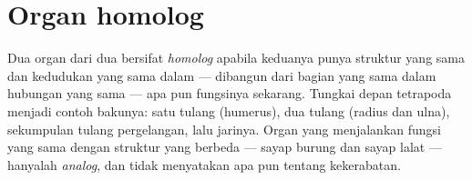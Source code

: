 \section{Organ homolog}

\begin{definition}[Homologi]\label{def:g10:common-ancestry:homology}
Dua organ dari dua  bersifat \emph{homolog}
apabila keduanya punya struktur yang sama dan kedudukan yang sama dalam
 --- dibangun dari bagian yang sama dalam hubungan yang
sama --- apa pun fungsinya sekarang. Tungkai depan tetrapoda menjadi
contoh bakunya: satu tulang (humerus), dua tulang (radius dan ulna),
sekumpulan tulang pergelangan, lalu jarinya. Organ yang menjalankan
fungsi yang sama dengan struktur yang berbeda --- sayap burung dan
sayap lalat --- hanyalah \emph{analog}, dan tidak menyatakan apa pun
tentang kekerabatan.
\end{definition}

